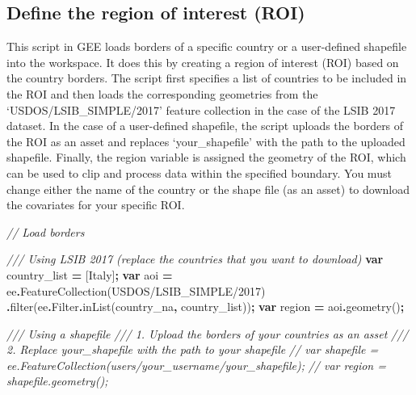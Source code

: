 \documentclass[
  10pt,
  b5paper,
  oneside]{book}
\newenvironment{Shaded}{\begin{snugshade}}{\end{snugshade}}
\newcommand{\AttributeTok}[1]{\textcolor[rgb]{0.77,0.63,0.00}{#1}}
\newcommand{\CommentTok}[1]{\textcolor[rgb]{0.56,0.35,0.01}{\textit{#1}}}
\newcommand{\FunctionTok}[1]{\textcolor[rgb]{0.00,0.00,0.00}{#1}}
\newcommand{\KeywordTok}[1]{\textcolor[rgb]{0.13,0.29,0.53}{\textbf{#1}}}
\newcommand{\NormalTok}[1]{#1}
\newcommand{\OperatorTok}[1]{\textcolor[rgb]{0.81,0.36,0.00}{\textbf{#1}}}
\newcommand{\StringTok}[1]{\textcolor[rgb]{0.31,0.60,0.02}{#1}}
\begin{document}
\hypertarget{define-the-region-of-interest-roi}{%
\subsection{Define the region of interest (ROI)}\label{define-the-region-of-interest-roi}}

This script in GEE loads borders of a specific country or a user-defined shapefile into the workspace. It does this by creating a region of interest (ROI) based on the country borders. The script first specifies a list of countries to be included in the ROI and then loads the corresponding geometries from the `USDOS/LSIB\_SIMPLE/2017' feature collection in the case of the LSIB 2017 dataset. In the case of a user-defined shapefile, the script uploads the borders of the ROI as an asset and replaces `your\_shapefile' with the path to the uploaded shapefile. Finally, the region variable is assigned the geometry of the ROI, which can be used to clip and process data within the specified boundary. You must change either the name of the country or the shape file (as an asset) to download the covariates for your specific ROI.

\begin{Shaded}
\begin{Highlighting}[]
\CommentTok{// Load borders }

\CommentTok{/// Using LSIB 2017 (replace the countries that you want to download)}
\KeywordTok{var}\NormalTok{ country\_list }\OperatorTok{=}\NormalTok{ [}\StringTok{\textquotesingle{}Italy\textquotesingle{}}\NormalTok{]}\OperatorTok{;}
\KeywordTok{var}\NormalTok{ aoi }\OperatorTok{=}\NormalTok{ ee}\OperatorTok{.}\FunctionTok{FeatureCollection}\NormalTok{(}\StringTok{\textquotesingle{}USDOS/LSIB\_SIMPLE/2017\textquotesingle{}}\NormalTok{)}
  \OperatorTok{.}\FunctionTok{filter}\NormalTok{(ee}\OperatorTok{.}\AttributeTok{Filter}\OperatorTok{.}\FunctionTok{inList}\NormalTok{(}\StringTok{\textquotesingle{}country\_na\textquotesingle{}}\OperatorTok{,}\NormalTok{ country\_list))}\OperatorTok{;}
\KeywordTok{var}\NormalTok{ region }\OperatorTok{=}\NormalTok{ aoi}\OperatorTok{.}\FunctionTok{geometry}\NormalTok{()}\OperatorTok{;}

\CommentTok{/// Using a shapefile}
\CommentTok{/// 1. Upload the borders of your countries as an asset}
\CommentTok{/// 2. Replace \textquotesingle{}your\_shapefile\textquotesingle{} with the path to your shapefile}
\CommentTok{// var shapefile = ee.FeatureCollection(\textquotesingle{}users/your\_username/your\_shapefile\textquotesingle{});}
\CommentTok{// var region = shapefile.geometry();}
\end{Highlighting}
\end{Shaded}
\end{document}
